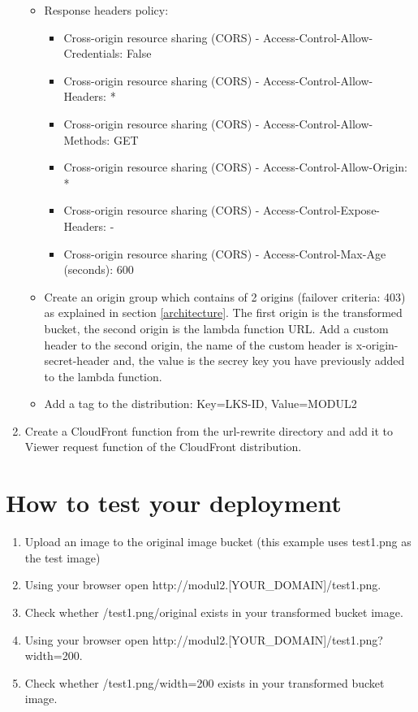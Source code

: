 \documentclass{article}
\begin{document}
\begin{enumerate}
\begin{itemize}
    \item Response headers policy:
    \begin{itemize}
      \item Cross-origin resource sharing (CORS) - Access-Control-Allow-Credentials: False
      \item Cross-origin resource sharing (CORS) - Access-Control-Allow-Headers: *
      \item Cross-origin resource sharing (CORS) - Access-Control-Allow-Methods: GET
      \item Cross-origin resource sharing (CORS) - Access-Control-Allow-Origin: *
      \item Cross-origin resource sharing (CORS) - Access-Control-Expose-Headers: -
      \item Cross-origin resource sharing (CORS) - Access-Control-Max-Age (seconds): 600
    \end{itemize}
    \item Create an origin group which contains of 2 origins (failover criteria: 403) as explained in section \ref{architecture}. The first origin is the transformed bucket, the second origin is the lambda function URL. Add a custom header to the second origin, the name of the custom header is x-origin-secret-header and, the value is the secrey key you have previously added to the lambda function.
    \item Add a tag to the distribution: Key=LKS-ID, Value=MODUL2
  \end{itemize}
  \item Create a CloudFront function from the url-rewrite directory and add it to Viewer request function of the CloudFront distribution.
\end{enumerate}
\section{How to test your deployment}
\begin{enumerate}
  \item Upload an image to the original image bucket (this example uses test1.png as the test image)
  \item Using your browser open http://modul2.[YOUR\_DOMAIN]/test1.png.
  \item Check whether /test1.png/original exists in your transformed bucket image.
  \item Using your browser open http://modul2.[YOUR\_DOMAIN]/test1.png?width=200.
  \item Check whether /test1.png/width=200 exists in your transformed bucket image.
\end{enumerate}
\end{document}
